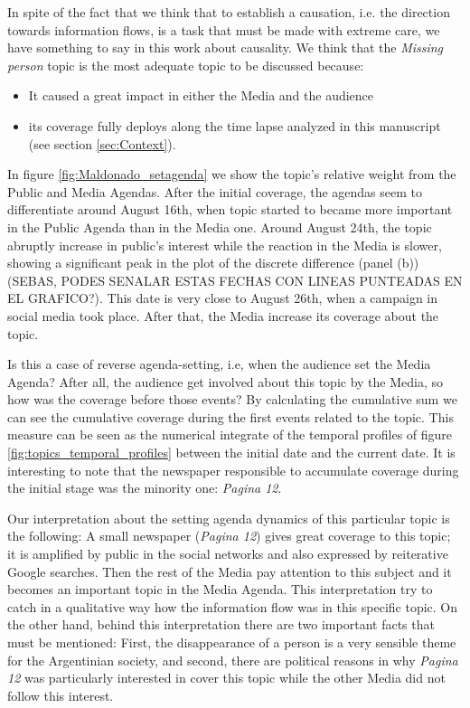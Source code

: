 \documentclass[a4paper, 12pt]{article}
\begin{document}
\par In spite of the fact that we think that to establish a causation, i.e. the direction towards information flows, is a task that must be made with extreme care, we have something to say in this work about causality. 
We think that the \emph{Missing person} topic is the most adequate topic to be discussed because:
\begin{itemize} 
\item It caused a great impact in either the Media and the audience
\item  its coverage fully deploys along the time lapse analyzed in this manuscript (see section \ref{sec:Context}).
\end{itemize}

\par In figure \ref{fig:Maldonado_setagenda} we show the topic's relative weight from the Public and Media Agendas.  After the initial coverage, the agendas seem to differentiate around August 16th, when topic started to became more important in the Public Agenda than in the Media one. Around August 24th, the topic abruptly increase in public's interest while the reaction in the Media is slower, showing a significant peak in the plot of the discrete difference (panel (b)) (SEBAS, PODES SENALAR ESTAS FECHAS CON LINEAS PUNTEADAS EN EL GRAFICO?). This date is very close to August 26th, when a campaign in social media took place. After that, the Media increase its coverage about the topic. 

\par Is this a case of reverse agenda-setting, i.e, when the audience set the Media Agenda? 
After all,  the audience get involved about this topic by the Media, so how was the coverage before those events?
By calculating the cumulative sum we can see  the cumulative coverage during the first events related to the topic. 
This measure can be seen as the numerical integrate of the temporal profiles of figure \ref{fig:topics_temporal_profiles} between the initial date and the current date. 
It is interesting to note that the newspaper responsible to accumulate coverage during the initial stage was the minority one: \emph{Pagina 12}. 

Our interpretation about the setting agenda dynamics of this particular topic is the following: A small newspaper (\emph{Pagina 12}) gives great coverage to this topic; it is amplified  by public in the social networks and also expressed  by reiterative Google searches. Then the rest of the Media  pay attention to this subject and it becomes an important topic in the Media Agenda. 
This interpretation try to catch in a qualitative way how the information flow was in this specific topic.
On the other hand, behind this interpretation there are two important facts that must be mentioned: First, the disappearance of a person is a very sensible theme for the Argentinian society, and second, there are political reasons in why \emph{Pagina 12} was particularly interested in cover this topic while the other Media did not follow this interest.
\end{document}
